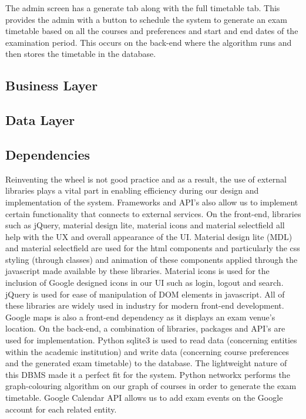 The admin screen has a generate tab along with the full timetable tab. This provides the admin with a button to schedule the system to generate an exam timetable based on all the courses and preferences and start and end dates of the examination period. This occurs on the back-end where the algorithm runs and then stores the timetable in the database.

\subsection{Business Layer}
\subsection{Data Layer}

\subsection{Dependencies}

Reinventing the wheel is not good practice and as a result, the use of external libraries plays a vital part in enabling efficiency during our design and implementation of the system. Frameworks and API’s also allow us to implement certain functionality that connects to external services.
On the front-end, libraries such as jQuery, material design lite, material icons and material selectfield all help with the UX and overall appearance of the UI. Material design lite (MDL) and material selectfield are used for the html components and particularly the css styling (through classes) and animation of these components applied through the javascript made available by these libraries. Material icons is used for the inclusion of Google designed icons in our UI such as login, logout and search. jQuery is used for ease of manipulation of DOM elements in javascript. All of these libraries are widely used in industry for modern front-end development. Google maps is also a front-end dependency as it displays an exam venue’s location.
On the back-end, a combination of libraries, packages and API’s are used for implementation. Python sqlite3 is used to read data (concerning entities within the academic institution) and write data (concerning course preferences and the generated exam timetable) to the database. The lightweight nature of this DBMS made it a perfect fit for the system. Python networkx performs the graph-colouring algorithm on our graph of courses in order to generate the exam timetable. Google Calendar API allows us to add exam events on the Google account for each related entity.


